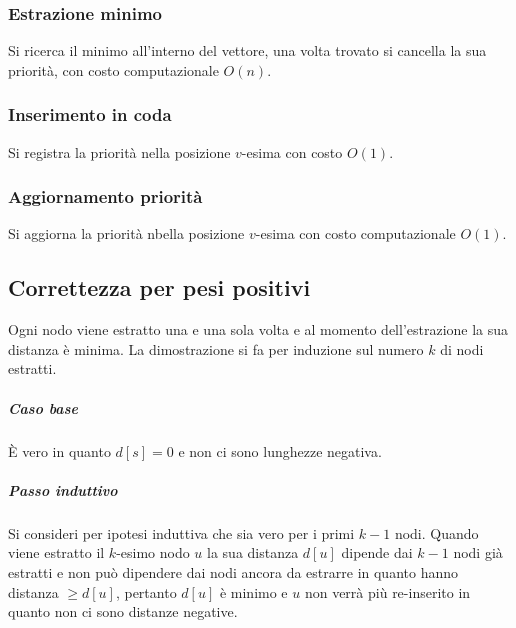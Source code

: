 \subsubsection{Estrazione minimo}
Si ricerca il minimo all'interno del vettore, una volta trovato si cancella la sua priorit\`a, con costo computazionale $O(n)$. 
\subsubsection{Inserimento in coda}
Si registra la priorit\`a nella posizione $v$-esima con costo $O(1)$.
\subsubsection{Aggiornamento priorit\`a}
Si aggiorna la priorit\`a nbella posizione $v$-esima con costo computazionale $O(1)$.
\subsection{Correttezza per pesi positivi}
Ogni nodo viene estratto una e una sola volta e al momento dell'estrazione la sua distanza \`e minima. La dimostrazione si fa per induzione sul numero $k$ di nodi estratti.
\subparagraph{Caso base}
\`E vero in quanto $d[s]=0$ e non ci sono lunghezze negativa.
\subparagraph{Passo induttivo}
Si consideri per ipotesi induttiva che sia vero per i primi $k-1$ nodi. Quando viene estratto il $k$-esimo nodo $u$ la sua distanza $d[u]$ dipende dai $k-1$ nodi gi\`a estratti e non 
pu\`o dipendere dai nodi ancora da estrarre in quanto hanno distanza $\ge d[u]$, pertanto $d[u]$ \`e minimo e $u$ non verr\`a pi\`u re-inserito in quanto non ci sono distanze negative.
